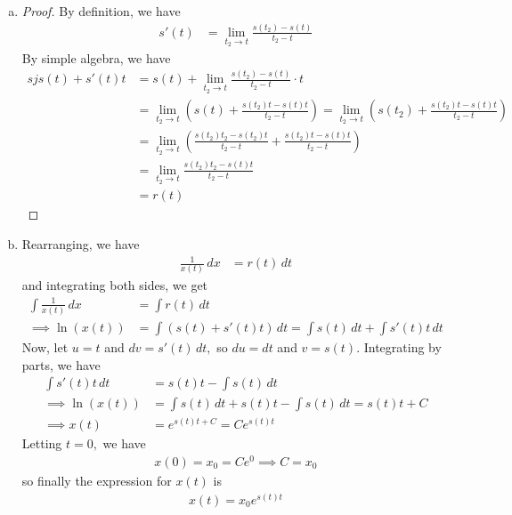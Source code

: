 \documentclass{article}
\begin{document}
\begin{enumerate}[1.]
\begin{enumerate}[(a)]
			\item
				\begin{proof}
					By definition, we have
					\begin{align*}
						s'(t) &= \lim_{t_2\to t} \frac{s(t_2)-s(t)}{t_2-t}
					\end{align*}
					By simple algebra, we have
					\begin{align*}sj
						s(t) + s'(t)t &= s(t) + \lim_{t_2\to t} \frac{s(t_2)-s(t)}{t_2-t}\cdot t \\
						&= \lim_{t_2\to t} \left( s(t) + \frac{s(t_2)t-s(t)t}{t_2-t} \right) = \lim_{t_2\to t}\left( s(t_2) + \frac{s(t_2)t-s(t)t}{t_2-t} \right) \\
						&= \lim_{t_2\to t}\left( \frac{s(t_2)t_2-s(t_2)t}{t_2-t} + \frac{s(t_2)t-s(t)t}{t_2-t} \right) \\
						&= \lim_{t_2\to t} \frac{s(t_2)t_2-s(t)t}{t_2-t} \\
						&= r(t)
					\end{align*}
				\end{proof}

			\item 
				\begin{soln}
					Rearranging, we have
					\begin{align*}
						\frac{1}{x(t)}\, dx &= r(t)\, dt
					\end{align*}
					and integrating both sides, we get
					\begin{align*}
						\int \frac{1}{x(t)}\, dx &= \int r(t)\, dt \\
						\implies \ln(x(t)) &= \int \left( s(t) + s'(t)t \right)\, dt = \int s(t)\, dt + \int s'(t)t\, dt
					\end{align*}
					Now, let $u=t$ and $dv = s'(t)\, dt,$ so $du=dt$ and $v = s(t).$ Integrating by parts, we have
					\begin{align*}
						\int s'(t)t\, dt &= s(t)t-\int s(t)\, dt \\
						\implies \ln(x(t)) &= \int s(t)\, dt + s(t)t - \int s(t)\, dt = s(t) t + C \\
						\implies x(t) &= e^{s(t)t+C} = Ce^{s(t)t}
					\end{align*}
					Letting $t=0,$ we have
					\begin{align*}
						x(0)=x_0 = Ce^0\implies C = x_0
					\end{align*}
					so finally the expression for $x(t)$ is
					\begin{align*}
						x(t) = \boxed{x_0 e^{s(t)t}}
					\end{align*}
				\end{soln}
		\end{enumerate}


\end{enumerate}
\end{document}
